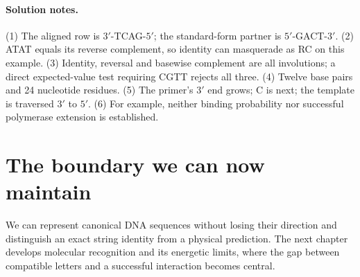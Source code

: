 \paragraph{Solution notes.}
(1) The aligned row is $3'$-TCAG-$5'$; the standard-form partner is
$5'$-GACT-$3'$. (2) ATAT equals its reverse complement, so identity can masquerade
as RC on this example. (3) Identity, reversal and basewise complement are all
involutions; a direct expected-value test requiring CGTT rejects all three.
(4) Twelve base pairs and 24 nucleotide residues. (5) The primer's $3'$ end
grows; C is next; the template is traversed $3'$ to $5'$. (6) For example,
neither binding probability nor successful polymerase extension is established.

\section*{The boundary we can now maintain}
We can represent canonical DNA sequences without losing their direction and
distinguish an exact string identity from a physical prediction. The next
chapter develops molecular recognition and its energetic limits, where the
gap between compatible letters and a successful interaction becomes central.
